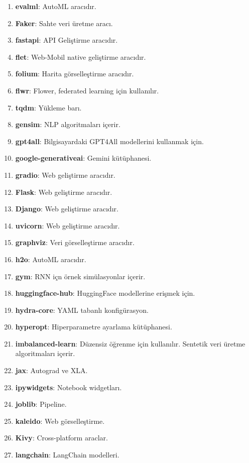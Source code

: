 \begin{enumerate}
    \item \textbf{evalml}: AutoML aracıdır.
    \item \textbf{Faker}: Sahte veri üretme aracı.
    \item \textbf{fastapi}: API Geliştirme aracıdır.
    \item \textbf{flet}: Web-Mobil native geliştirme aracıdır.
    \item \textbf{folium}: Harita görselleştirme aracıdır.
    \item \textbf{flwr}: Flower, federated learning için kullanılır.
    \item \textbf{tqdm}: Yükleme barı.
    \item \textbf{gensim}: NLP algoritmaları içerir.
    \item \textbf{gpt4all}: Bilgisayardaki GPT4All modellerini kullanmak için.
    \item \textbf{google-generativeai}: Gemini kütüphanesi.
    \item \textbf{gradio}: Web geliştirme aracıdır.
    \item \textbf{Flask}: Web geliştirme aracıdır.
    \item \textbf{Django}: Web geliştirme aracıdır.
    \item \textbf{uvicorn}: Web geliştirme aracıdır.
    \item \textbf{graphviz}: Veri görselleştirme aracıdır.
    \item \textbf{h2o}: AutoML aracıdır.
    \item \textbf{gym}: RNN içn örnek simülasyonlar içerir.
    \item \textbf{huggingface-hub}: HuggingFace modellerine erişmek için.
    \item \textbf{hydra-core}: YAML tabanlı konfigürasyon.
    \item \textbf{hyperopt}: Hiperparametre ayarlama kütüphanesi.
    \item \textbf{imbalanced-learn}: Düzensiz öğrenme için kullanılır. Sentetik veri üretme algoritmaları içerir.
    \item \textbf{jax}: Autograd ve XLA.
    \item \textbf{ipywidgets}: Notebook widgetları.
    \item \textbf{joblib}: Pipeline.
    \item \textbf{kaleido}: Web görselleştirme.
    \item \textbf{Kivy}: Cross-platform araclar.
    \item \textbf{langchain}: LangChain modelleri.

\end{enumerate}

